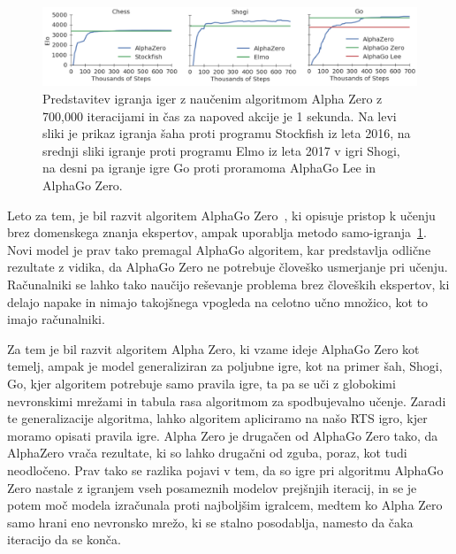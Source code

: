 \documentclass[a4paper, 12pt]{book}
\begin{document}
\begin{figure}[h]
	\begin{center}
		\includegraphics[width=1\textwidth]{photos/go.pdf}
	\end{center}
	\caption{Predstavitev igranja iger z naučenim algoritmom Alpha Zero z 700,000 iteracijami in čas za napoved akcije je 1 sekunda. Na levi sliki je prikaz igranja šaha proti programu Stockfish iz leta 2016, na srednji sliki igranje proti programu Elmo iz leta 2017 v igri Shogi, na desni pa igranje igre Go proti proramoma AlphaGo Lee in AlphaGo Zero. }
	\label{picCompareGo}
\end{figure}


Leto za tem, je bil razvit algoritem AlphaGo Zero~\cite{silver2017mastering}, ki opisuje pristop k učenju brez domenskega znanja ekspertov, ampak uporablja metodo samo-igranja~\ref{picCompareGo}. 
Novi model je prav tako premagal AlphaGo algoritem, kar predstavlja odlične rezultate z vidika, da AlphaGo Zero ne potrebuje človeško usmerjanje pri učenju.
Računalniki se lahko tako naučijo reševanje problema brez človeških ekspertov, ki delajo napake in nimajo takojšnega vpogleda na celotno učno množico, kot to imajo računalniki.

Za tem je bil razvit algoritem Alpha Zero, ki vzame ideje AlphaGo Zero kot temelj, ampak je model generaliziran za poljubne igre, kot na primer šah, Shogi, Go, kjer algoritem potrebuje samo pravila igre, ta pa se uči z globokimi nevronskimi mrežami in tabula rasa algoritmom za spodbujevalno učenje.
Zaradi te generalizacije algoritma, lahko algoritem apliciramo na našo RTS igro, kjer moramo opisati pravila igre.
Alpha Zero je drugačen od AlphaGo Zero tako, da AlphaZero vrača rezultate, ki so lahko drugačni od zguba, poraz, kot tudi neodločeno.
Prav tako se razlika pojavi v tem, da so igre pri algoritmu AlphaGo Zero nastale z igranjem vseh posameznih modelov prejšnjih iteracij, in se je potem moč modela izračunala proti najboljšim igralcem, medtem ko Alpha Zero samo hrani eno nevronsko mrežo, ki se stalno posodablja, namesto da čaka iteracijo da se konča.
\end{document}
